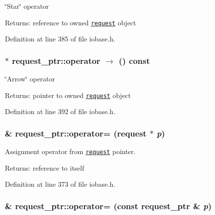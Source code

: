 \char`\"{}Star\char`\"{} operator 

\begin{Desc}
\item[Returns:]reference to owned {\tt \hyperlink{classrequest}{request}} object \end{Desc}


Definition at line 385 of file iobase.h.\hypertarget{group__iolayer_g9ccc7167eaa30948950571a094b9c902}{
\subsubsection[{operator-$>$}]{$\ast$ request\_\-ptr::operator $\rightarrow$  () const}}
\label{group__iolayer_g9ccc7167eaa30948950571a094b9c902}


\char`\"{}Arrow\char`\"{} operator 

\begin{Desc}
\item[Returns:]pointer to owned {\tt \hyperlink{classrequest}{request}} object \end{Desc}


Definition at line 392 of file iobase.h.\hypertarget{group__iolayer_gfef634a7f244626b88ccfb71f93060e8}{
\subsubsection[{operator=}]{\& request\_\-ptr::operator= ({\bf request} $\ast$ {\em p})}}
\label{group__iolayer_gfef634a7f244626b88ccfb71f93060e8}


Assignment operator from {\tt \hyperlink{classrequest}{request}} pointer. 

\begin{Desc}
\item[Returns:]reference to itself \end{Desc}


Definition at line 373 of file iobase.h.\hypertarget{group__iolayer_g1f361f479f69ffb179ec4b54615aa1b5}{
\subsubsection[{operator=}]{\& request\_\-ptr::operator= (const {\bf request\_\-ptr} \& {\em p})}}
\label{group__iolayer_g1f361f479f69ffb179ec4b54615aa1b5}


